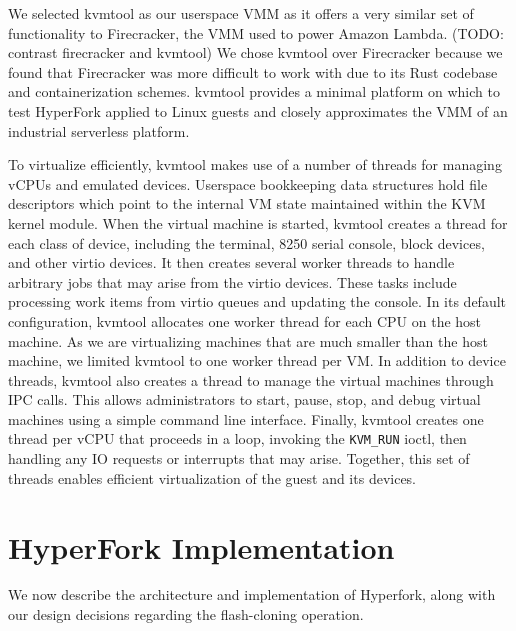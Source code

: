 We selected kvmtool as our userspace VMM as it offers a very similar set of
functionality to Firecracker, the VMM used to power Amazon Lambda. (TODO:
contrast firecracker and kvmtool) We chose kvmtool over Firecracker because we
found that Firecracker was more difficult to work with due to its Rust codebase
and containerization schemes. kvmtool provides a minimal platform on which to
test HyperFork applied to Linux guests and closely approximates the VMM of an
industrial serverless platform.

To virtualize efficiently, kvmtool makes use of a number of threads for
managing vCPUs and emulated devices. Userspace bookkeeping data structures hold
file descriptors which point to the internal VM state maintained within the KVM
kernel module. When the virtual machine is started, kvmtool creates a thread
for each class of device, including the terminal, 8250 serial console, block
devices, and other virtio devices. It then creates several worker threads to
handle arbitrary jobs that may arise from the virtio devices. These tasks
include processing work items from virtio queues and updating the console. In
its default configuration, kvmtool allocates one worker thread for each CPU on
the host machine. As we are virtualizing machines that are much smaller than
the host machine, we limited kvmtool to one worker thread per VM. In addition
to device threads, kvmtool also creates a thread to manage the virtual machines
through IPC calls. This allows administrators to start, pause, stop, and debug
virtual machines using a simple command line interface. Finally, kvmtool
creates one thread per vCPU that proceeds in a loop, invoking the
\texttt{KVM\_RUN} ioctl, then handling any IO requests or interrupts that may
arise. Together, this set of threads enables efficient virtualization of the
guest and its devices.

\section{HyperFork Implementation}

We now describe the architecture and implementation of Hyperfork, along with
our design decisions regarding the flash-cloning operation.

